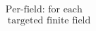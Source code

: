\documentclass[preview]{standalone}
\begin{document}
\begin{align*}
\text{Per-field: for each} \\\ \text{targeted finite field}
\end{align*}
\end{document}
